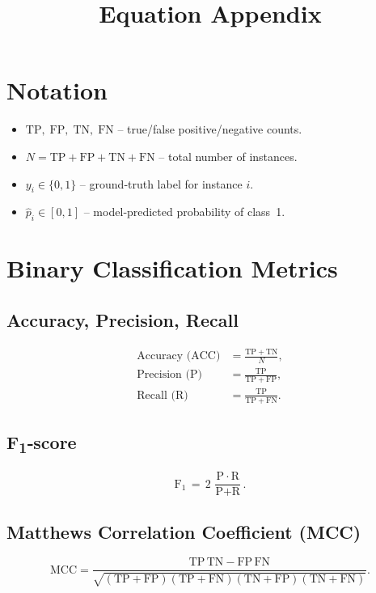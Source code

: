 \documentclass[12pt]{article}
\title{Equation Appendix}
\author{}
\date{}
\begin{document}
\maketitle

\section*{Notation}
\begin{itemize}
  \item $\mathrm{TP},\;\mathrm{FP},\;\mathrm{TN},\;\mathrm{FN}$ – true/false positive/negative counts.
  \item $N = \mathrm{TP}+\mathrm{FP}+\mathrm{TN}+\mathrm{FN}$ – total number of instances.
  \item $y_i\in\{0,1\}$ – ground‑truth label for instance $i$.
  \item $\hat{p}_i \in [0,1]$ – model‑predicted probability of class~1.
\end{itemize}

\section{Binary Classification Metrics}
\subsection{Accuracy, Precision, Recall}
\begin{align}
  \text{Accuracy (ACC)} &= \frac{\mathrm{TP}+\mathrm{TN}}{N}, \\[4pt]
  \text{Precision (P)} &= \frac{\mathrm{TP}}{\mathrm{TP}+\mathrm{FP}}, \\[4pt]
  \text{Recall (R)} &= \frac{\mathrm{TP}}{\mathrm{TP}+\mathrm{FN}}. 
\end{align}

\subsection{F\textsubscript{1}‑score}
\begin{equation}
  \text{F}_{1} \,=\, 2\,\frac{\text{P}\,\cdot\,\text{R}}{\text{P}+\text{R}}.
\end{equation}

\subsection{Matthews Correlation Coefficient (MCC)}
\begin{equation}
  \text{MCC} = \frac{\mathrm{TP}\,\mathrm{TN} - \mathrm{FP}\,\mathrm{FN}}{\sqrt{(\mathrm{TP}+\mathrm{FP})(\mathrm{TP}+\mathrm{FN})(\mathrm{TN}+\mathrm{FP})(\mathrm{TN}+\mathrm{FN})}}.
\end{equation}
\end{document}
